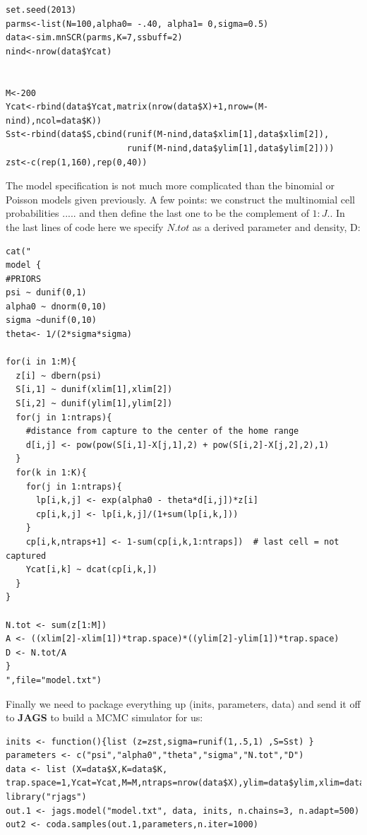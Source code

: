 {{\small 
\begin{verbatim}
set.seed(2013)
parms<-list(N=100,alpha0= -.40, alpha1= 0,sigma=0.5)
data<-sim.mnSCR(parms,K=7,ssbuff=2)
nind<-nrow(data$Ycat)


M<-200
Ycat<-rbind(data$Ycat,matrix(nrow(data$X)+1,nrow=(M-nind),ncol=data$K))
Sst<-rbind(data$S,cbind(runif(M-nind,data$xlim[1],data$xlim[2]),
                        runif(M-nind,data$ylim[1],data$ylim[2])))
zst<-c(rep(1,160),rep(0,40))
\end{verbatim}
}

The model specification is not much more complicated than the binomial
or Poisson models given previously. A few points: we construct the 
multinomial cell probabilities ..... and then define the last
one to be the complement of $1:J$.. In the last lines of code here we
specify $N.tot$ as a derived parameter and density, D:
{\small
\begin{verbatim}
cat("
model {
#PRIORS
psi ~ dunif(0,1)
alpha0 ~ dnorm(0,10)
sigma ~dunif(0,10)
theta<- 1/(2*sigma*sigma)

for(i in 1:M){
  z[i] ~ dbern(psi)
  S[i,1] ~ dunif(xlim[1],xlim[2])
  S[i,2] ~ dunif(ylim[1],ylim[2])
  for(j in 1:ntraps){
    #distance from capture to the center of the home range
    d[i,j] <- pow(pow(S[i,1]-X[j,1],2) + pow(S[i,2]-X[j,2],2),1)
  }
  for(k in 1:K){
    for(j in 1:ntraps){
      lp[i,k,j] <- exp(alpha0 - theta*d[i,j])*z[i]            
      cp[i,k,j] <- lp[i,k,j]/(1+sum(lp[i,k,]))
    }
    cp[i,k,ntraps+1] <- 1-sum(cp[i,k,1:ntraps])  # last cell = not captured
    Ycat[i,k] ~ dcat(cp[i,k,])
  }  
}   

N.tot <- sum(z[1:M]) 
A <- ((xlim[2]-xlim[1])*trap.space)*((ylim[2]-ylim[1])*trap.space)
D <- N.tot/A
}
",file="model.txt")
\end{verbatim}
}


Finally we need to package everything up (inits, parameters, data) and send
it off to {\bf JAGS} to build a MCMC simulator for us:

{\small
\begin{verbatim}
inits <- function(){list (z=zst,sigma=runif(1,.5,1) ,S=Sst) }              
parameters <- c("psi","alpha0","theta","sigma","N.tot","D")
data <- list (X=data$X,K=data$K,
trap.space=1,Ycat=Ycat,M=M,ntraps=nrow(data$X),ylim=data$ylim,xlim=data$xlim)         
library("rjags")
out.1 <- jags.model("model.txt", data, inits, n.chains=3, n.adapt=500)
out2 <- coda.samples(out.1,parameters,n.iter=1000)
\end{verbatim}
}


}
